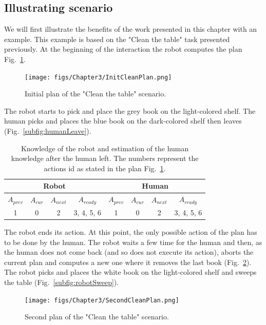 \documentclass[english,a4paper,11pt,twoside]{StyleThese}
\begin{document}
\subsection{Illustrating scenario}

We will first illustrate the benefits of the work presented in this chapter with an example. This example is based on the "Clean the table" task presented previously. At the beginning of the interaction the robot computes the plan Fig.~\ref{fig:initPlanClean}. 

\begin{figure}[!h]
	\centering
    \texttt{[image: figs/Chapter3/InitCleanPlan.png]}
    \caption{Initial plan of the "Clean the table" scenario. }
    \label{fig:initPlanClean}
\end{figure}


The robot starts to pick and place the grey book on the light-colored shelf. The human picks and places the blue book on the dark-colored shelf then leaves (Fig.~\ref{subfig:humanLeave}).

\begin{table}[!h]
\begin{center}
\begin{tabular}{|c|c|c|c||c|c|c|c|}
\hline
\multicolumn{4}{|c||}{Robot} & \multicolumn{4}{c|}{Human}\\
\hline
$A_{prev}$ & $A_{cur}$ & $A_{next}$ & $A_{ready}$ & $A_{prev}$ & $A_{cur}$ & $A_{next}$ & $A_{ready}$\\
\hline
\hline
1 & 0 & 2 & 3, 4, 5, 6 & 1 & 0 & 2 & 3, 4, 5, 6\\
\hline
\end{tabular}
\end{center}
\caption{Knowledge of the robot and estimation of the human knowledge after the human left. The numbers represent the actions id as stated in the plan Fig.~\ref{fig:initPlanClean}.}
\label{table:results}
\end{table}

The robot ends its action. At this point, the only possible action of the plan has to be done by the human. The robot waits a few time for the human and then, as the human does not come back (and so does not execute its action), aborts the current plan and computes a new one where it removes the last book (Fig.~\ref{fig:newplan}).
The robot picks and places the white book on the light-colored shelf and sweeps the table (Fig.~\ref{subfig:robotSweep}).

\begin{figure}[!h]
	\centering
    \texttt{[image: figs/Chapter3/SecondCleanPlan.png]}
    \caption{Second plan of the "Clean the table" scenario.}
    \label{fig:newplan}
\end{figure}
\end{document}
